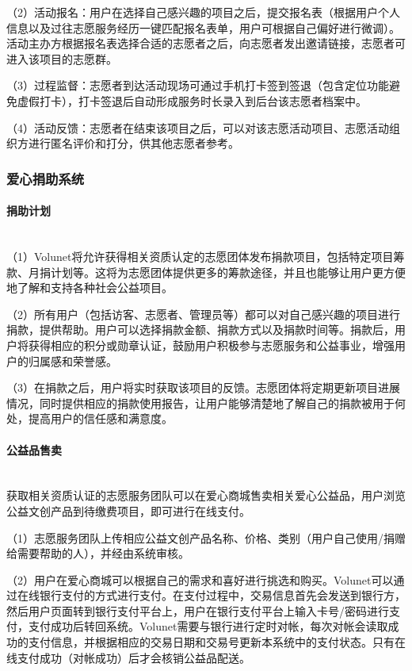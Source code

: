（2）活动报名：用户在选择自己感兴趣的项目之后，提交报名表（根据用户个人信息以及过往志愿服务经历一键匹配报名表单，用户可根据自己偏好进行微调）。活动主办方根据报名表选择合适的志愿者之后，向志愿者发出邀请链接，志愿者可进入该项目的志愿群。

（3）过程监督：志愿者到达活动现场可通过手机打卡签到签退（包含定位功能避免虚假打卡），打卡签退后自动形成服务时长录入到后台该志愿者档案中。

（4）活动反馈：志愿者在结束该项目之后，可以对该志愿活动项目、志愿活动组织方进行匿名评价和打分，供其他志愿者参考。




\subsubsection{爱心捐助系统}

\paragraph{捐助计划}~{}
\\

（1）Volunet将允许获得相关资质认定的志愿团体发布捐款项目，包括特定项目筹款、月捐计划等。这将为志愿团体提供更多的筹款途径，并且也能够让用户更方便地了解和支持各种社会公益项目。

（2）所有用户（包括访客、志愿者、管理员等）都可以对自己感兴趣的项目进行捐款，提供帮助。用户可以选择捐款金额、捐款方式以及捐款时间等。捐款后，用户将获得相应的积分或勋章认证，鼓励用户积极参与志愿服务和公益事业，增强用户的归属感和荣誉感。

（3）在捐款之后，用户将实时获取该项目的反馈。志愿团体将定期更新项目进展情况，同时提供相应的捐款使用报告，让用户能够清楚地了解自己的捐款被用于何处，提高用户的信任感和满意度。

\paragraph{公益品售卖}~{}
\\

获取相关资质认证的志愿服务团队可以在爱心商城售卖相关爱心公益品，用户浏览公益文创产品到待缴费项目，即可进行在线支付。

（1）志愿服务团队上传相应公益文创产品名称、价格、类别（用户自己使用/捐赠给需要帮助的人），并经由系统审核。

（2）用户在爱心商城可以根据自己的需求和喜好进行挑选和购买。Volunet可以通过在线银行支付的方式进行支付。在支付过程中，交易信息首先会发送到银行方，然后用户页面转到银行支付平台上，用户在银行支付平台上输入卡号/密码进行支付，支付成功后转回系统。Volunet需要与银行进行定时对帐，每次对帐会读取成功的支付信息，并根据相应的交易日期和交易号更新本系统中的支付状态。只有在线支付成功（对帐成功）后才会核销公益品配送。

